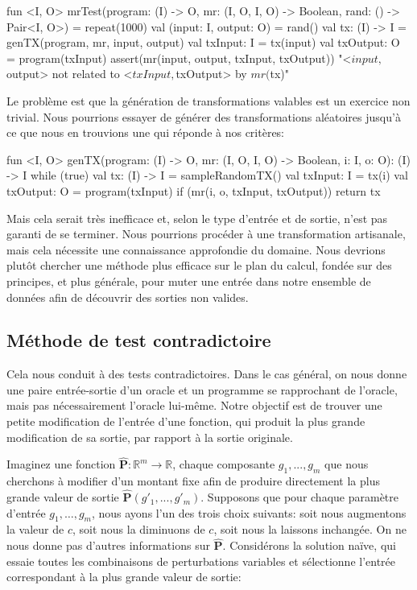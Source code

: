 \begin{kotlinlisting}
fun <I, O> mrTest(program: (I) -> O, mr: (I, O, I, O) -> Boolean, rand: () -> Pair<I, O>) =
    repeat(1000) {
        val (input: I, output: O) = rand()
        val tx: (I) -> I = genTX(program, mr, input, output)
        val txInput: I = tx(input)
        val txOutput: O = program(txInput)
        assert(mr(input, output, txInput, txOutput)) {
            "<$input, $output> not related to <$txInput, $txOutput> by $mr ($tx)"
        }
    }
\end{kotlinlisting}
%
Le problème est que la génération de transformations valables est un exercice non trivial. Nous pourrions essayer de générer des transformations aléatoires jusqu'à ce que nous en trouvions une qui réponde à nos critères:
%
\begin{kotlinlisting}
fun <I, O> genTX(program: (I) -> O, mr: (I, O, I, O) -> Boolean, i: I, o: O): (I) -> I {
    while (true) {
        val tx: (I) -> I = sampleRandomTX()
        val txInput: I = tx(i)
        val txOutput: O = program(txInput)
        if (mr(i, o, txInput, txOutput)) return tx
    }
}
\end{kotlinlisting}

Mais cela serait très inefficace et, selon le type d'entrée et de sortie, n'est pas garanti de se terminer. Nous pourrions procéder à une transformation artisanale, mais cela nécessite une connaissance approfondie du domaine. Nous devrions plutôt chercher une méthode plus efficace sur le plan du calcul, fondée sur des principes, et plus générale, pour muter une entrée dans notre ensemble de données afin de découvrir des sorties non valides.

\subsection{Méthode de test contradictoire}

Cela nous conduit à des tests contradictoires. Dans le cas général, on nous donne une paire entrée-sortie d'un oracle et un programme se rapprochant de l'oracle, mais pas nécessairement l'oracle lui-même. Notre objectif est de trouver une petite modification de l'entrée d'une fonction, qui produit la plus grande modification de sa sortie, par rapport à la sortie originale.

Imaginez une fonction $\mathbf{\hat P}: \mathbb R^m \rightarrow \mathbb R$, chaque composante $g_1, ..., g_{m}$ que nous cherchons à modifier d'un montant fixe afin de produire directement la plus grande valeur de sortie $\mathbf{\hat P}(g'_1, ..., g'_{m})$. Supposons que pour chaque paramètre d'entrée $g_1, \ldots, g_{m}$, nous ayons l'un des trois choix suivants: soit nous augmentons la valeur de $c$, soit nous la diminuons de $c$, soit nous la laissons inchangée. On ne nous donne pas d'autres informations sur $\mathbf{\hat P}$. Considérons la solution na\"ive, qui essaie toutes les combinaisons de perturbations variables et sélectionne l'entrée correspondant à la plus grande valeur de sortie:

